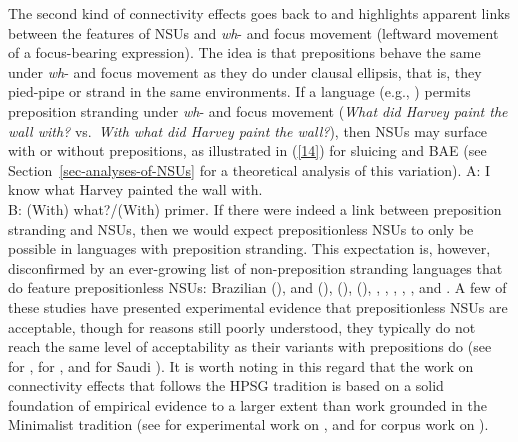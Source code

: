 The second kind of connectivity effects goes back to \citet{Merchant2001, Merchant2005a} and highlights apparent links between the features of NSUs and \emph{wh}- and focus movement (leftward movement of a focus-bearing expression). The idea is that prepositions behave the same under \emph{wh}- and focus movement as they do under clausal ellipsis, that is, they pied-pipe or strand in the same environments. If a language (e.g., ) permits preposition stranding under \emph{wh}- and focus movement (\emph{What did Harvey paint the wall with?} vs.\ \emph{With what did Harvey paint the wall?}), then NSUs may surface with or without prepositions, as illustrated in (\ref{14}) for sluicing and BAE (see Section~\ref{sec-analyses-of-NSUs} for a theoretical analysis of this variation).
%
\ea A: I know what Harvey painted the wall with.\\B: (With) what?/(With) primer.\label{14}\z
%
If there were indeed a link between preposition stranding and NSUs, then we would expect prepositionless NSUs to only be possible in languages with preposition stranding. This expectation is, however, disconfirmed by an ever-growing list of non-preposition stranding languages that do feature prepositionless NSUs: Brazilian  (\citealt{AlmeidaYoshida2007}),  and  (\citealt{Rodrigues2006}),  (\citealt{Molimpakis2018}),  (\citealt{Fortin2007}), %
  \citep{Philippova2014},  \citep{Szczegielniak2008, Sag2011, Nykiel2013}, %
 \citep{Abels2017},  \citep{Stjepanovic2008, Stjepanovic2012},  \citet{Abeille2019}, and %
 \citep{Leung2014, Alshaalan2020}. A few of these studies have presented experimental evidence that prepositionless NSUs are acceptable, though for reasons still poorly understood, they typically do not reach the same level of acceptability as their variants with prepositions do (see \citealt{Nykiel2013} for , \citealt{Molimpakis2018} for , and \citealt{Alshaalan2020} for Saudi ). It is worth noting in this regard that the work on connectivity effects that follows the HPSG tradition is based on a solid foundation of empirical evidence to a larger extent than work grounded in the Minimalist tradition (see \citealt{Sag2011, Nykiel2013} for experimental work on , and \citealt{Nykiel2015, Nykiel2017, Nykiel2020} for corpus work on ).


